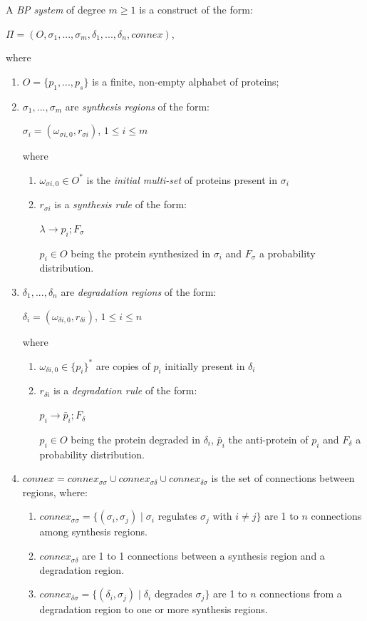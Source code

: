 \documentclass[runningheads,a4paper]{llncs}
\begin{document}
A \emph{BP system} of degree $m \geq 1$ is a construct of the form:
\begin{center} $\Pi = ( O, \sigma_1, ..., \sigma_m, \delta_1, ..., \delta_n, connex)$,\end{center}
where
\begin{enumerate}
\item $O=\{p_1, ..., p_s \}$ is a finite, non-empty alphabet of proteins;
\item $\sigma_1, ..., \sigma_m$ are \emph{synthesis regions} of the form:
\begin{center} $\sigma_i = (\omega_{\sigma i,0},r_{\sigma i})$, $1 \leq i \leq m$\end{center}
where
\begin{enumerate}
\item $\omega_{\sigma i,0} \in O^*$ is the \emph{initial multi-set} of proteins present in $\sigma_i$
\item $r_{\sigma i}$ is a \emph{synthesis rule} of the form:
\begin{center} $\lambda \rightarrow p_i; F_\sigma$\end{center}
$p_i \in O$ being the protein synthesized in $\sigma_i$ and $F_\sigma$ a probability distribution.
\end{enumerate}
\item $\delta_1, ..., \delta_n$ are \emph{degradation regions} of the form:
\begin{center} $\delta_i = (\omega_{\delta i,0},r_{\delta i})$, $1 \leq i \leq n$\end{center}
where
\begin{enumerate}
\item $\omega_{\delta i,0} \in \{p_i\}^*$ are copies of $p_i$ initially present in $\delta_i$
\item $r_{\delta i}$ is a \emph{degradation rule} of the form:
\begin{center} $p_i \rightarrow \bar{p}_i; F_\delta$\end{center}
$p_i \in O$ being the protein degraded in $\delta_i$, $\bar{p}_i$ the anti-protein of $p_i$ and $F_\delta$ a probability distribution.
\end{enumerate}
\item $connex = connex_{\sigma \sigma} \cup connex_{\sigma \delta} \cup connex_{\delta \sigma}$ is the set of connections between regions, where:
\begin{enumerate}
\item $connex_{\sigma \sigma} = \{(\sigma_i, \sigma_j)\;|\;\sigma_i$ regulates $\sigma_j$ with $i \neq j \}$ are 1 to $n$ connections among synthesis regions.
\item $connex_{\sigma \delta}$ are 1 to 1 connections between a synthesis region and a degradation region.
\item $connex_{\delta \sigma} = \{(\delta_i, \sigma_j)\;|\;\delta_i$ degrades $\sigma_j\}$ are 1 to $n$ connections from a degradation region to one or more synthesis regions.
\end{enumerate}
\end{enumerate}
\end{document}
